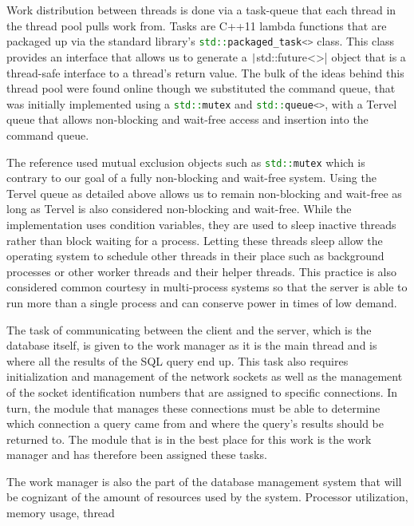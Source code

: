 \documentclass[letterpaper, 12pt]{article}
\newcommand{\inlinecode}[1]{\colorbox{codegrey}{\lstinline[language=C++]{#1}}}
\begin{document}
Work distribution between threads is done via a task-queue that each thread in the
thread pool pulls work from. Tasks are C++11 lambda functions that are packaged up
via the standard library's \inlinecode{std::packaged_task<>}
 class.
This class provides an interface that allows us to generate a \inlinecode|std::future<>|
object that is a thread-safe interface to a thread's return value. The bulk of the
ideas behind this thread pool were found online \cite{stackoverflow1} though we substituted
the command queue, that was initially implemented using a \inlinecode{std::mutex}
and \inlinecode{std::queue<>}, with a Tervel queue that allows
non-blocking and wait-free access and insertion into the command queue.
\par\vspace{\baselineskip}
The reference used mutual exclusion objects such as \inlinecode{std::mutex}
which is contrary to our goal of a fully non-blocking and wait-free system. Using the Tervel
queue as detailed above allows us to remain non-blocking and wait-free as long as Tervel
is also considered non-blocking and wait-free. While the implementation uses condition variables,
they are used to sleep inactive threads rather than block waiting for a process. Letting these
threads sleep allow the operating system to schedule other threads in their place such as
background processes or other worker threads and their helper threads. This practice is also
considered common courtesy in multi-process systems so that the server is able to run more than
a single process and can conserve power in times of low demand.
\par\vspace{\baselineskip}
The task of communicating between the client and the server, which is the database itself,
is given to the work manager as it is the main thread and is where all the results of
the SQL query end up. This task also requires initialization and management of the network
sockets as well as the management of the socket identification numbers that are assigned
to specific connections. In turn, the module that manages these connections must be able to
determine which connection a query came from and where the query's results should be
returned to. The module that is in the best place for this work is the work manager
and has therefore been assigned these tasks.
\par\vspace{\baselineskip}
The work manager is also the part of the database management system that will be cognizant
of the amount of resources used by the system. Processor utilization, memory usage, thread
\end{document}
